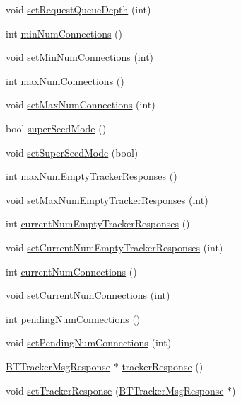 \begin{DoxyCompactItemize}
\item 
void \hyperlink{classBTPeerWireBase_af47f87051f1ca07b2de86389c5ad4b80}{set\+Request\+Queue\+Depth} (int)
\item 
int \hyperlink{classBTPeerWireBase_a25f1944b519274b519ae97c6ca8c9cd3}{min\+Num\+Connections} ()
\item 
void \hyperlink{classBTPeerWireBase_a0c4732ce52b8d764b4193254343af554}{set\+Min\+Num\+Connections} (int)
\item 
int \hyperlink{classBTPeerWireBase_a6631a73bc91baf371d07a39875e86ad4}{max\+Num\+Connections} ()
\item 
void \hyperlink{classBTPeerWireBase_a32043d147fb1a8a2f1b99a6d014d53fe}{set\+Max\+Num\+Connections} (int)
\item 
bool \hyperlink{classBTPeerWireBase_a8ead752e4053f1998856e5e8c47ff759}{super\+Seed\+Mode} ()
\item 
void \hyperlink{classBTPeerWireBase_a2465710d8e3555d859ceee03b6310a33}{set\+Super\+Seed\+Mode} (bool)
\item 
int \hyperlink{classBTPeerWireBase_a0d0d461305c68f8a1220f2c3a6ce3077}{max\+Num\+Empty\+Tracker\+Responses} ()
\item 
void \hyperlink{classBTPeerWireBase_a3c48ea8679cbbeb59fa19c64361ee089}{set\+Max\+Num\+Empty\+Tracker\+Responses} (int)
\item 
int \hyperlink{classBTPeerWireBase_a18e202d18a4260b3c569ccf08a82f44d}{current\+Num\+Empty\+Tracker\+Responses} ()
\item 
void \hyperlink{classBTPeerWireBase_ae09405b6778985b374b0535b9495f374}{set\+Current\+Num\+Empty\+Tracker\+Responses} (int)
\item 
int \hyperlink{classBTPeerWireBase_a8057a2998c2dcc5ebc96c51f62ad1ff4}{current\+Num\+Connections} ()
\item 
void \hyperlink{classBTPeerWireBase_ae341c076136c11ff24176be976ab2e4b}{set\+Current\+Num\+Connections} (int)
\item 
int \hyperlink{classBTPeerWireBase_adb866231c50fa05206cb82491b847c2b}{pending\+Num\+Connections} ()
\item 
void \hyperlink{classBTPeerWireBase_a734e7f46269546945f42db6968fa95b0}{set\+Pending\+Num\+Connections} (int)
\item 
\hyperlink{classBTTrackerMsgResponse}{B\+T\+Tracker\+Msg\+Response} $\ast$ \hyperlink{classBTPeerWireBase_a2c8fc43d80de9ea28f43a942aa8f873f}{tracker\+Response} ()
\item 
void \hyperlink{classBTPeerWireBase_aa1dc18c9f0d02c7ae4e6b65197bfd233}{set\+Tracker\+Response} (\hyperlink{classBTTrackerMsgResponse}{B\+T\+Tracker\+Msg\+Response} $\ast$)

\end{DoxyCompactItemize}
